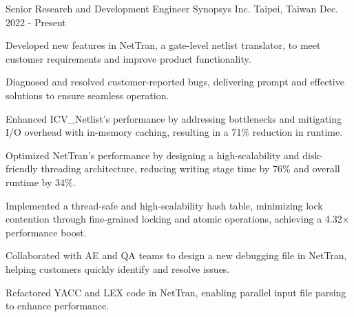 

\begin{cventries}

  \cventry
    {Senior Research and Development Engineer} %
    {Synopsys Inc.} %
    {Taipei, Taiwan} %
    {Dec. 2022 - Present} %
    {
      \begin{cvitems} %
        \item {Developed new features in NetTran, a gate-level netlist translator, to meet customer requirements and improve product functionality.}
        \item {Diagnosed and resolved customer-reported bugs, delivering prompt and effective solutions to ensure seamless operation.}
        \item {Enhanced ICV\_Netlist’s performance by addressing bottlenecks and mitigating I/O overhead with in-memory caching, resulting in a 71\% reduction in runtime.}
        \item {Optimized NetTran’s performance by designing a high-scalability and disk-friendly threading architecture, reducing writing stage time by 76\% and overall runtime by 34\%.}
        \item {Implemented a thread-safe and high-scalability hash table, minimizing lock contention through fine-grained locking and atomic operations, achieving a 4.32× performance boost.}
        \item {Collaborated with AE and QA teams to design a new debugging file in NetTran, helping customers quickly identify and resolve issues.}
        \item {Refactored YACC and LEX code in NetTran, enabling parallel input file parsing to enhance performance.}
      \end{cvitems}
    }

\end{cventries}
